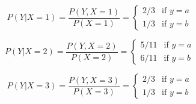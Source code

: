 \[
P(Y|X=1) = \frac{P(Y, X=1)}{P(X=1)} = 
    \begin{cases}
        2/3 & \text{if } y=a \\
        1/3 & \text{if } y=b
    \end{cases}
\]

\[
P(Y|X=2) = \frac{P(Y, X=2)}{P(X=2)} = 
    \begin{cases}
        5/11 & \text{if } y=a \\
        6/11 & \text{if } y=b
    \end{cases}
\]

\[
P(Y|X=3) = \frac{P(Y, X=3)}{P(X=3)} = 
    \begin{cases}
        2/3 & \text{if } y=a \\
        1/3 & \text{if } y=b
    \end{cases}
\]